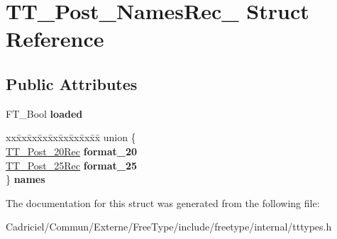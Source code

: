 \hypertarget{struct_t_t___post___names_rec__}{}\section{T\+T\+\_\+\+Post\+\_\+\+Names\+Rec\+\_\+ Struct Reference}
\label{struct_t_t___post___names_rec__}
\subsection*{Public Attributes}
\begin{DoxyCompactItemize}
\item 
F\+T\+\_\+\+Bool {\bfseries loaded}\hypertarget{struct_t_t___post___names_rec___a8878ac4555c3df60958869f0d53383c9}{}\label{struct_t_t___post___names_rec___a8878ac4555c3df60958869f0d53383c9}

\item 
\begin{tabbing}
xx\=xx\=xx\=xx\=xx\=xx\=xx\=xx\=xx\=\kill
union \{\\
\>\hyperlink{struct_t_t___post__20_rec__}{TT\_Post\_20Rec} {\bfseries format\_20}\\
\>\hyperlink{struct_t_t___post__25__}{TT\_Post\_25Rec} {\bfseries format\_25}\\
\} {\bfseries names}\hypertarget{struct_t_t___post___names_rec___a6588c0cf135465501f71286c47470937}{}\label{struct_t_t___post___names_rec___a6588c0cf135465501f71286c47470937}
\\

\end{tabbing}\end{DoxyCompactItemize}


The documentation for this struct was generated from the following file\+:\begin{DoxyCompactItemize}
\item 
Cadriciel/\+Commun/\+Externe/\+Free\+Type/include/freetype/internal/tttypes.\+h\end{DoxyCompactItemize}
